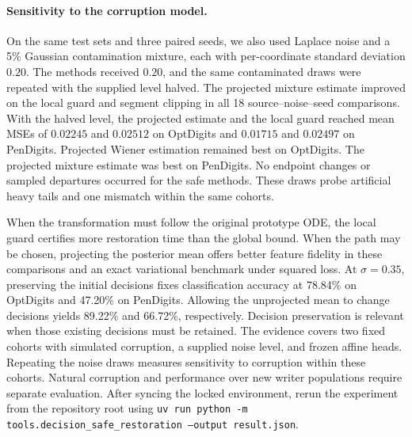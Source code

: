 \paragraph{Sensitivity to the corruption model.}
On the same test sets and three paired seeds, we also used Laplace noise
and a 5\% Gaussian contamination mixture, each with per-coordinate
standard deviation $0.20$. The methods received $0.20$, and the
same contaminated draws were repeated with the supplied level halved.
The projected mixture estimate improved on the local guard and segment
clipping in all 18 source--noise--seed comparisons. With the halved
level, the projected estimate and the local guard reached mean MSEs
of $0.02245$ and $0.02512$ on OptDigits and $0.01715$ and $0.02497$
on PenDigits. Projected Wiener estimation remained best on OptDigits.
The projected mixture estimate was best on PenDigits. No endpoint
changes or sampled departures occurred for the safe methods. These
draws probe artificial heavy tails and one mismatch within the same
cohorts.

When the transformation must follow the original prototype ODE, the local guard certifies more restoration time than the global bound. When the path may be chosen, projecting the posterior mean offers better feature fidelity in these comparisons and an exact variational benchmark under squared loss. At \(\sigma=0.35\), preserving the initial decisions fixes classification accuracy at 78.84\% on OptDigits and 47.20\% on PenDigits. Allowing the unprojected mean to change decisions yields 89.22\% and 66.72\%, respectively. Decision preservation is relevant when those existing decisions must be retained. The evidence covers two fixed cohorts with simulated corruption, a supplied noise level, and frozen affine heads. Repeating the noise draws measures sensitivity to corruption within these cohorts. Natural corruption and performance over new writer populations require separate evaluation. After syncing the locked environment, rerun the experiment from the repository root using \texttt{uv run python -m tools.decision\_safe\_restoration --output result.json}.
